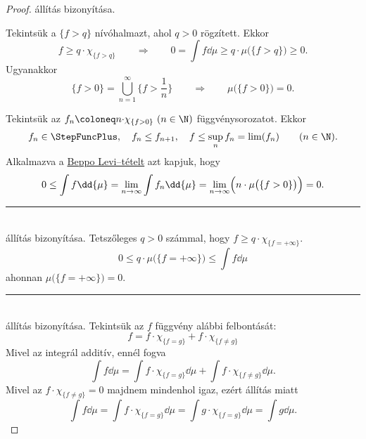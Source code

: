 \documentclass[
]{elteikthesis}[2024/04/26]
\begin{document}
	\begin{proof}
		 állítás bizonyítása.
		
		\Ifstep Tekintsük a \( \{ f > q \} \) nívóhalmazt, ahol \( q > 0 \) rögzített. Ekkor
		\[
			f \geq q \cdot \chi_{\{ f > q \}}
			\qquad \Longrightarrow \qquad
			0 = 
			\int f \dd{\mu} \geq 
			q \cdot \mu \bigl( \{ f > q \} \bigr) \geq 0.
		\]
		Ugyanakkor
		\[
			\{ f > 0 \} = 
			\bigcup_{n = 1}^{\infty} \biggl\{ f > \frac{1}{n} \biggr\}
			\qquad \Longrightarrow \qquad
			\mu \bigl( \{ f > 0 \} \bigr) = 0.
		\]
		
		\Backifstep Tekintsük az \( f_n \coloneq n {\cdot} \chi_{\{ f > 0 \}}  \ (n \in \N) \) függvénysorozatot. Ekkor
		\[
			f_n \in \StepFuncPlus, \quad
			f_n \leq f_{n + 1}, \quad
			f \leq \sup_{n} f_n = \lim( f_n )
			\qquad (n \in \N).
		\]
		Alkalmazva a \hyperref[th:beppo-levi]{Beppo Levi--tételt} azt kapjuk, hogy
		\[
			0 \leq
			\int f \dd{\mu} =
			\lim_{n \to \infty} \int f_n \dd{\mu} = 
			\lim_{n \to \infty} \Bigl( n \cdot \mu \bigl( \{ f > 0 \} \bigr) \Bigr) = 0.
		\]
		
		\noindent\rule{\linewidth}{0.4pt}\\
		
		 állítás bizonyítása.
		Tetszőleges \( q > 0 \) számmal, hogy \( f \geq q {\cdot} \chi_{\{ f = +\infty \}} \).
		\[
			0 \leq
			q \cdot \mu\bigl( \{ f = +\infty \} \bigr) \leq 
			\int f \dd{\mu}
		\]
		ahonnan \( \mu \bigl( \{ f = +\infty \} \bigr) = 0 \).
		
		\noindent\rule{\linewidth}{0.4pt}\\
		
		 állítás bizonyítása.
		Tekintsük az \( f \) függvény alábbi felbontását:
		\[
			f = f \cdot \chi_{\{ f = g \}} + f \cdot \chi_{\{ f \neq g \}}
		\]
		Mivel az integrál additív, ennél fogva
		\[
			\int f \dd{\mu} =
			\int f {\cdot} \chi_{\{ f = g \}} \dd{\mu} +
			\int f {\cdot} \chi_{\{ f \neq g \}} \dd{\mu}.
		\]
		Mivel az \( f {\cdot} \chi_{\{ f \neq g \}} = 0 \) majdnem mindenhol igaz, 
		ezért  állítás miatt
		\[
			\int f \dd{\mu} =
			\int f {\cdot} \chi_{\{ f = g \}} \dd{\mu} =
			\int g {\cdot} \chi_{\{ f = g \}} \dd{\mu} =
			\int g \dd{\mu}.
		\]
	\end{proof}
	
\end{document}
